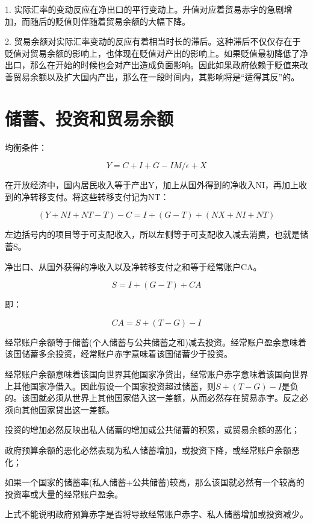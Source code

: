 \documentclass{article}
\begin{document}
1. 实际汇率的变动反应在净出口的平行变动上。升值对应着贸易赤字的急剧增加，而随后的贬值则伴随着贸易余额的大幅下降。

2. 贸易余额对实际汇率变动的反应有着相当时长的滞后。这种滞后不仅仅存在于贬值对贸易余额的影响上，也体现在贬值对产出的影响上。如果贬值最初降低了净出口，那么在开始的时候也会对产出造成负面影响。因此如果政府依赖于贬值来改善贸易余额以及扩大国内产出，那么在一段时间内，其影响将是“适得其反”的。

\section{储蓄、投资和贸易余额}

均衡条件：

\[
Y=C+I+G-IM/\epsilon+X
\]

在开放经济中，国内居民收入等于产出Y，加上从国外得到的净收入NI，再加上收到的净转移支付。将这些转移支付记为NT：

\[
(Y+NI+NT-T)-C=I+(G-T)+(NX+NI+NT)
\]

左边括号内的项目等于可支配收入，所以左侧等于可支配收入减去消费，也就是储蓄S。

净出口、从国外获得的净收入以及净转移支付之和等于经常账户CA。

\[
S=I+(G-T)+CA
\]

即：

\[
CA=S+(T-G)-I
\]

经常账户余额等于储蓄(个人储蓄与公共储蓄之和)减去投资。经常账户盈余意味着该国储蓄多余投资，经常账户赤字意味着该国储蓄少于投资。

经常账户余额意味着该国向世界其他国家净贷出，经常账户赤字意味着该国向世界上其他国家净借入。因此假设一个国家投资超过储蓄，则$ S+(T-G)-I $是负的。该国就必须从世界上其他国家借入这一差额，从而必然存在贸易赤字。反之必须向其他国家贷出这一差额。

\hspace*{\fill}

投资的增加必然反映出私人储蓄的增加或公共储蓄的积累，或贸易余额的恶化；

政府预算余额的恶化必然表现为私人储蓄增加，或投资下降，或经常账户余额恶化；

如果一个国家的储蓄率(私人储蓄+公共储蓄)较高，那么该国就必然有一个较高的投资率或大量的经常账户盈余。

上式不能说明政府预算赤字是否将导致经常账户赤字、私人储蓄增加或投资减少。

	
	
\end{document}
